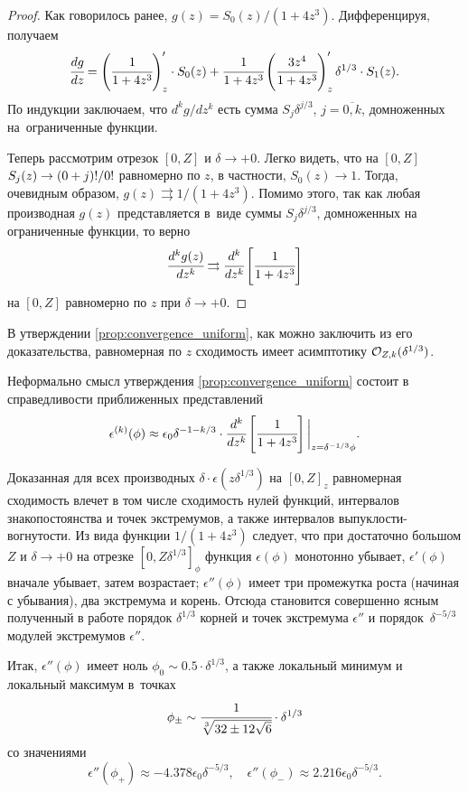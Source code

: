 \begin{proof}
Как говорилось ранее, $g(z) = S_0(z) / (1 + 4 z^3)$. Дифференцируя, получаем
\[
    \cfrac{dg}{dz} = \left( \cfrac{1}{1 + 4 z^3} \right)'_z \cdot S_0(z) + \cfrac{1}{1 + 4 z^3} \left( \cfrac{3 z^4}{1 + 4 z^3} \right)'_z \delta^{1/3} \cdot S_1(z).
\]
По индукции заключаем, что $d^k g / d z^k$ есть сумма $S_j \delta^{j / 3}$, $j = \overline{0, k}$, домноженных на~ограниченные функции.

Теперь рассмотрим отрезок $[0, Z]$ и $\delta \to +0$. Легко видеть, что на $[0, Z]$ $S_j(z) \hm \to (0 + j)! / 0!$ равномерно по $z$, в частности, $S_0(z) \to 1$. Тогда, очевидным образом, $g(z) \rightrightarrows 1 / (1 + 4 z^3)$. Помимо этого, так как любая производная $g(z)$ представляется в~виде суммы $S_j \delta^{j / 3}$, домноженных на ограниченные функции, то верно
\[
    \cfrac{d^k g(z)}{d z^k} \rightrightarrows \cfrac{d^k}{d z^k} \left[ \cfrac{1}{1 + 4 z^3} \right]
\]
на $[0, Z]$ равномерно по $z$ при $\delta \to +0$.

\end{proof}

\begin{remark}
    В утверждении \ref{prop:convergence_uniform}, как можно заключить из его доказательства, равномерная по $z$ сходимость имеет асимптотику ${\mathcal{O}}_{Z, k}(\delta^{1/3})$.
\end{remark}

Неформально смысл утверждения \ref{prop:convergence_uniform} состоит в справедливости приближенных представлений
\[
    \epsilon^{(k)}(\phi) \approx \epsilon_0 \delta^{-1 - k / 3} \cdot \cfrac{d^k}{d z^k} \left[ \cfrac{1}{1 + 4 z^3} \right] \bigg|_{z = \delta^{-1/3} \phi}.
\]

Доказанная для всех производных $\delta \cdot \epsilon(z \delta^{1/3})$ на $[0, Z]_z$ равномерная сходимость влечет в том числе сходимость нулей функций, интервалов знакопостоянства и точек экстремумов, а также интервалов выпуклости-вогнутости. Из вида функции $1 / (1 + 4z^3)$ следует, что при достаточно большом $Z$ и $\delta \to +0$ на отрезке $[0, Z \delta^{1/3}]_\phi$ функция $\epsilon(\phi)$ монотонно убывает, $\epsilon'(\phi)$ вначале убывает, затем возрастает; $\epsilon''(\phi)$ имеет три промежутка роста (начиная с убывания), два экстремума и корень. Отсюда становится совершенно ясным полученный в работе \cite{ponomarev_stability} порядок $\delta^{1/3}$ корней и точек экстремума $\epsilon''$ и порядок~$\delta^{-5/3}$ модулей экстремумов $\epsilon''$.

Итак, $\epsilon''(\phi)$ имеет ноль $\phi_0 \sim 0.5 \cdot \delta^{1/3}$, а также локальный минимум и локальный максимум в~точках
\[
    \phi_\pm \sim \cfrac{1}{\sqrt[3]{32 \pm 12 \sqrt{6}}} \cdot \delta^{1/3}
\]
со значениями
\[
    \epsilon''(\phi_+) \approx -4.378 \epsilon_0 \delta^{-5 / 3}, \quad \epsilon''(\phi_-) \approx 2.216 \epsilon_0 \delta^{-5 / 3}.
\]

